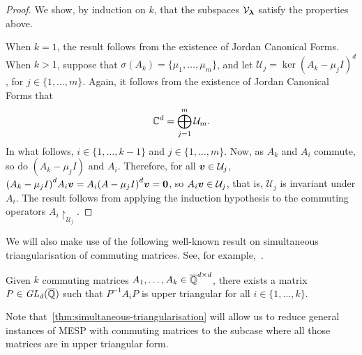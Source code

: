 \begin{proof}
We show, by induction on $k$, that the subspaces $\mathcal{V}_{\boldsymbol{\lambda}}$ satisfy the properties above.

When $k = 1$, the result follows from the existence of Jordan Canonical Forms. When $k > 1$, suppose that $\sigma(A_{k}) = \lbrace \mu_{1}, \ldots, \mu_{m} \rbrace$, and let $\mathcal{U}_{j} = \ker{(A_{k} - \mu_{j} I)}^{d}$, for $j \in \lbrace 1, \ldots, m \rbrace$. Again, it follows from the existence of Jordan Canonical Forms that
\begin{align*}
\mathbb{C}^{d} = \bigoplus \limits_{j = 1}^{m} \mathcal{U}_{m} .
\end{align*}
In what follows, $i \in \lbrace 1, \ldots, k-1 \rbrace$ and $j \in \lbrace 1, \ldots, m \rbrace$. Now, as $A_{k}$ and $A_{i}$ commute, so do $(A_{k}-\mu_{j} I)$ and $A_{i}$. Therefore, for all $\boldsymbol{v} \in \mathcal{U}_{j}$, ${(A_{k} - \mu_{j} I)}^{d} A_{i} \boldsymbol{v} = A_{i} {(A-\mu_{j} I)}^{d} \boldsymbol{v} = \boldsymbol{0}$, so $A_{i} \boldsymbol{v} \in \mathcal{U}_{j}$, that is, $\mathcal{U}_{j}$ is invariant under $A_{i}$. The result follows from applying the induction hypothesis to the commuting operators $A_{i} \restriction_{\mathcal{U}_{j}}$.
\end{proof}

We will also make use of the following well-known result on simultaneous triangularisation of commuting matrices. See, for example,~\cite{CommutingMatrices}.

\begin{theorem}
\label{thm:simultaneous-triangularisation}
Given $k$ commuting matrices $A_{1}, \ldots, A_{k} \in \overline{\mathbb{Q}}^{d \times d}$, there exists a matrix $P \in \mathit{GL}_{d}(\overline{\mathbb{Q}})$ such that $P^{-1}A_{i}P$ is upper triangular for all $i \in \lbrace 1, \ldots, k \rbrace$.
\end{theorem}

Note that~\cref{thm:simultaneous-triangularisation} will allow us to reduce general instances of MESP with commuting matrices to the subcase where all those matrices are in upper triangular form.
